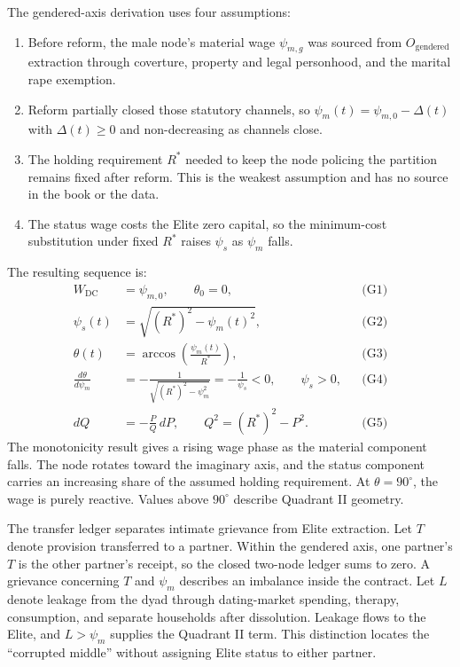\documentclass[12pt]{article}
\begin{document}
The gendered-axis derivation uses four assumptions:
\begin{enumerate}[label=\textbf{A\arabic*.}]
  \item Before reform, the male node's material wage $\psi_{m,g}$ was sourced from $O_{\text{gendered}}$ extraction through coverture, property and legal personhood, and the marital rape exemption.
  \item Reform partially closed those statutory channels, so $\psi_m(t)=\psi_{m,0}-\Delta(t)$ with $\Delta(t)\geq 0$ and non-decreasing as channels close.
  \item The holding requirement $R^*$ needed to keep the node policing the partition remains fixed after reform. This is the weakest assumption and has no source in the book or the data.
  \item The status wage costs the Elite zero capital, so the minimum-cost substitution under fixed $R^*$ raises $\psi_s$ as $\psi_m$ falls.
\end{enumerate}

The resulting sequence is:
\begin{align}
  W_{\text{DC}} &= \psi_{m,0}, \qquad \theta_0=0, &&\text{(G1)}\\
  \psi_s(t) &= \sqrt{(R^*)^2-\psi_m(t)^2}, &&\text{(G2)}\\
  \theta(t) &= \arccos\!\left(\frac{\psi_m(t)}{R^*}\right), &&\text{(G3)}\\
  \frac{d\theta}{d\psi_m}
    &= -\frac{1}{\sqrt{(R^*)^2-\psi_m^2}}
     = -\frac{1}{\psi_s}<0, \qquad \psi_s>0, &&\text{(G4)}\\
  dQ &= -\frac{P}{Q}\,dP,
  \qquad Q^2=(R^*)^2-P^2. &&\text{(G5)}
\end{align}
The monotonicity result gives a rising wage phase as the material component falls. The node rotates toward the imaginary axis, and the status component carries an increasing share of the assumed holding requirement. At $\theta=90^\circ$, the wage is purely reactive. Values above $90^\circ$ describe Quadrant II geometry.

The transfer ledger separates intimate grievance from Elite extraction. Let $T$ denote provision transferred to a partner. Within the gendered axis, one partner's $T$ is the other partner's receipt, so the closed two-node ledger sums to zero. A grievance concerning $T$ and $\psi_m$ describes an imbalance inside the contract. Let $L$ denote leakage from the dyad through dating-market spending, therapy, consumption, and separate households after dissolution. Leakage flows to the Elite, and $L>\psi_m$ supplies the Quadrant II term. This distinction locates the “corrupted middle” without assigning Elite status to either partner.
\end{document}
